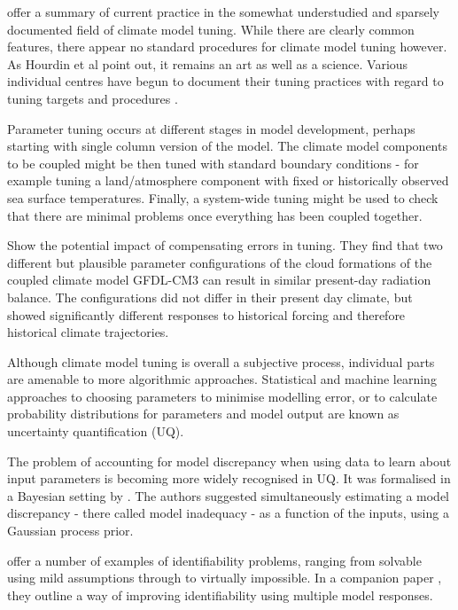 \documentclass[gmd, manuscript]{copernicus}
\begin{document}
\cite{hourdin2017art} offer a summary of current practice in the somewhat understudied and sparsely documented field of climate model tuning. While there are clearly common features, there appear no standard procedures for climate model tuning however. As Hourdin et al point out, it remains an art as well as a science. Various individual centres have begun to document their tuning practices with regard to tuning targets and procedures \citep{schmidt2017practice, zhao2018gfdl, walters2017um7}.

Parameter tuning occurs at different stages in model development, perhaps starting with single column version of the model. The climate model components to be coupled might be then tuned with standard boundary conditions - for example tuning a land/atmosphere component with fixed or historically observed sea surface temperatures. Finally, a system-wide tuning might be used to check  that there are minimal  problems once everything has been coupled together. 

\cite{golaz2013cloud} Show the potential impact of compensating errors in tuning. They find that two different but plausible parameter configurations of the cloud formations of the coupled climate model GFDL-CM3 can result in similar present-day radiation balance. The configurations did not differ in their present day climate, but showed significantly different responses to historical forcing and therefore historical climate trajectories.

Although climate model tuning is overall a subjective process, individual parts are amenable to more algorithmic approaches. Statistical and machine learning approaches to choosing parameters to minimise modelling error, or to calculate probability distributions for parameters and model output are known as uncertainty quantification (UQ). 

The problem of accounting for model discrepancy when using data to learn about input parameters is becoming more widely recognised in UQ. It was formalised in a Bayesian setting by \cite{kennedy2001bayesian}. The authors suggested simultaneously estimating a model discrepancy  - there called model inadequacy - as a function of the inputs, using a Gaussian process prior. 

\cite{arendt2012quantification} offer a number of examples of identifiability problems, ranging from solvable using mild assumptions through to virtually impossible. In a companion paper \citep{arendt2012improving}, they outline a way of improving identifiability using multiple model responses.
\end{document}
